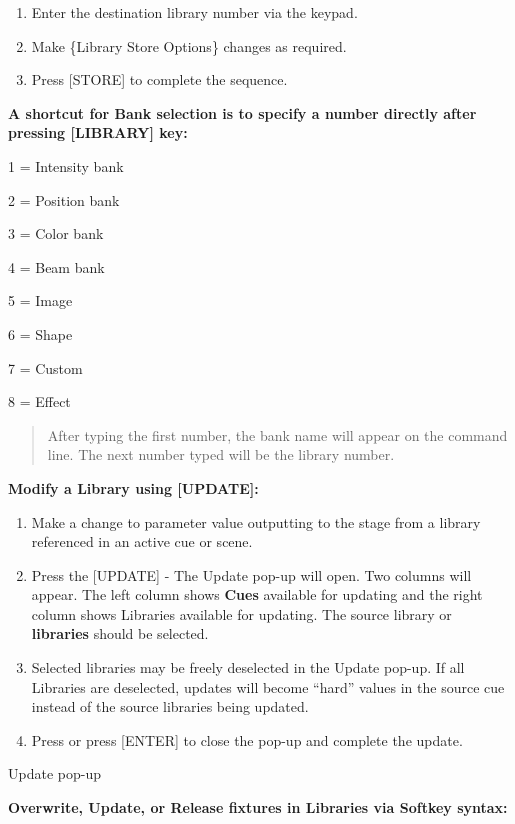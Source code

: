 \documentclass[
]{article}
\begin{document}
\begin{enumerate}
\def\labelenumi{\arabic{enumi}.}
\setcounter{enumi}{4}
\item
  Enter the destination library number via the keypad.
\item
  Make \{Library Store Options\} changes as required.
\item
  Press {[}STORE{]} to complete the sequence.
\end{enumerate}

\textbf{A shortcut for Bank selection is to specify a number directly after pressing {[}LIBRARY{]} key:}

1 = Intensity bank

2 = Position bank

3 = Color bank

4 = Beam bank

5 = Image

6 = Shape

7 = Custom

8 = Effect

\begin{quote}
After typing the first number, the bank name will appear on the command line. The next number typed will be the library number.
\end{quote}

\textbf{Modify a Library using {[}UPDATE{]}:}

\begin{enumerate}
\def\labelenumi{\arabic{enumi}.}
\item
  Make a change to parameter value outputting to the stage from a library referenced in an active cue or scene.
\item
  Press the {[}UPDATE{]} - The Update pop-up will open. Two columns will appear. The left column shows \textbf{Cues} available for updating and the right column shows Libraries available for updating. The source library or \textbf{libraries} should be selected.
\item
  Selected libraries may be freely deselected in the Update pop-up. If all Libraries are deselected, updates will become ``hard'' values in the source cue instead of the source libraries being updated.
\item
  Press or press {[}ENTER{]} to close the pop-up and complete the update.
\end{enumerate}

Update pop-up

\textbf{Overwrite, Update, or Release fixtures in Libraries via Softkey syntax:}
\end{document}
